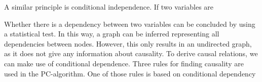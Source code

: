 \documentclass[a4paper, 10pt, english, twocolumn]{article}
\begin{document}
A similar principle is conditional independence. If two variables are 

Whether there is a dependency between two variables can be concluded by using a statistical test.
In this way, a graph can be inferred representing all dependencies between nodes.
However, this only results in an undirected graph, as it does not give any information about causality.
To derive causal relations, we can make use of conditional dependence.
Three rules for finding causality are used in the PC-algorithm.
One of those rules is based on conditional dependency 



%
\end{document}
